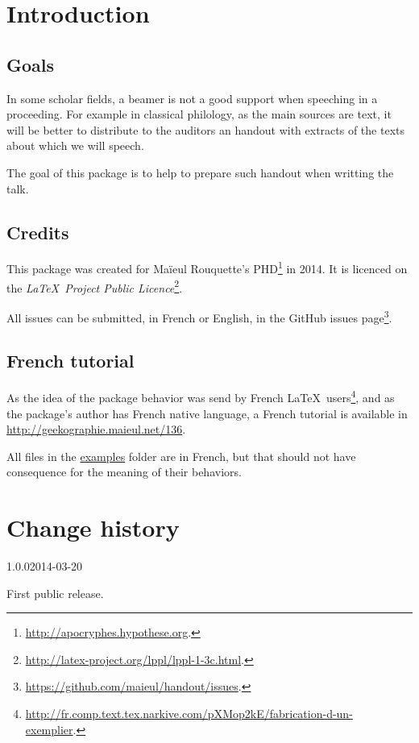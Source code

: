 \documentclass{ltxdockit}[2011/03/25]
\begin{document}
\printtitlepage
\tableofcontents

\section{Introduction}
\subsection{Goals}

In some scholar fields, a beamer is not a good support when speeching in a proceeding. For example in classical philology, as the main sources are text, it will be better to distribute to the auditors an handout with extracts of the texts about which we will speech.

The goal of this package is to help to prepare such handout when writting the talk.

\subsection{Credits}

This package was created for Maïeul Rouquette's PHD\footnote{\url{http://apocryphes.hypothese.org}.} in 2014. It is licenced on the \emph{\LaTeX\ Project Public Licence}\footnote{\url{http://latex-project.org/lppl/lppl-1-3c.html}.}.

All issues can be submitted, in French or English, in the GitHub issues page\footnote{\url{https://github.com/maieul/handout/issues}.}.

\subsection{French tutorial}

As the idea of the package behavior was send by French \LaTeX\ users\footnote{\url{http://fr.comp.text.tex.narkive.com/pXMop2kE/fabrication-d-un-exemplier}.}, and as the package's author has French native language, a French tutorial is available in \url{http://geekographie.maieul.net/136}. 

All files in the \href{file:examples}{examples} folder are in French, but that should not have consequence for the meaning of their behaviors.


\section{Change history}

\begin{changelog}

\begin{release}{1.0.0}{2014-03-20}
\item First public release.
\end{release}
\end{changelog}
\end{document}
